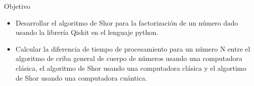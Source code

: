 \begin{frame}{Objetivo}
    \begin{itemize}
    \item Desarrollar el algoritmo de Shor para la factorización de un número dado usando la librería Qiskit en el lenguaje python.
    \item Calcular la diferencia de tiempo de procesamiento para un número N entre el algoritmo de criba general de cuerpo de números 
    usando una computadora clásica, el algoritmo de Shor usando una computadora clásica y el algortimo de Shor usando una computadora cuántica.
\end{itemize}
\end{frame}
